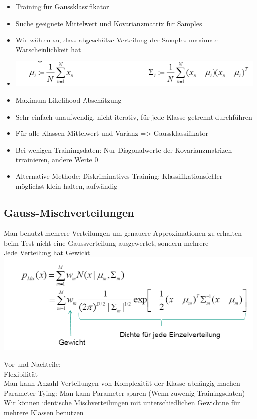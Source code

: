 \documentclass[a4paper,10pt,oneside]{article}
\begin{document}
\begin{itemize}
	\item Training für Gaussklassifikator
	\item Suche geeignete Mittelwert und Kovarianzmatrix für Samples
	\item Wir wählen so, dass abgeschätze Verteilung der Samples maximale Warscheinlichkeit hat
	\item \includegraphics[scale=0.65]{Grafiken/traininggauss.png}
	\item Maximum Likelihood Abschätzung
	\item Sehr einfach unaufwendig, nicht iterativ, für jede Klasse getrennt durchführen
	\item Für alle Klassen Mittelwert und Varianz => Gaussklassifikator
	\item Bei wenigen Trainingsdaten: Nur Diagonalwerte der Kovarianzmatrizen trrainieren, andere Werte 0
	\item Alternative Methode: Diskriminatives Training: Klassifikationsfehler möglichst klein halten, aufwändig
\end{itemize}


\subsection{Gauss-Mischverteilungen}
Man benutzt mehrere Verteilungen um genauere Approximationen zu erhalten\\
beim Test nicht eine Gaussverteilung ausgewertet, sondern mehrere\\
Jede Verteilung hat Gewicht
\includegraphics[scale=0.65]{Grafiken/dichtefunktionmisch.png}

Vor und Nachteile:\\
Flexibilität\\
Man kann Anzahl Verteilungen von Komplexität der Klasse abhängig machen\\
Parameter Tying: Man kann Parameter sparen (Wenn zuwenig Trainingsdaten)\\
Wir können identische Mischverteilungen mit unterschiedlichen Gewichtne für mehrere Klassen benutzen\\
\end{document}
